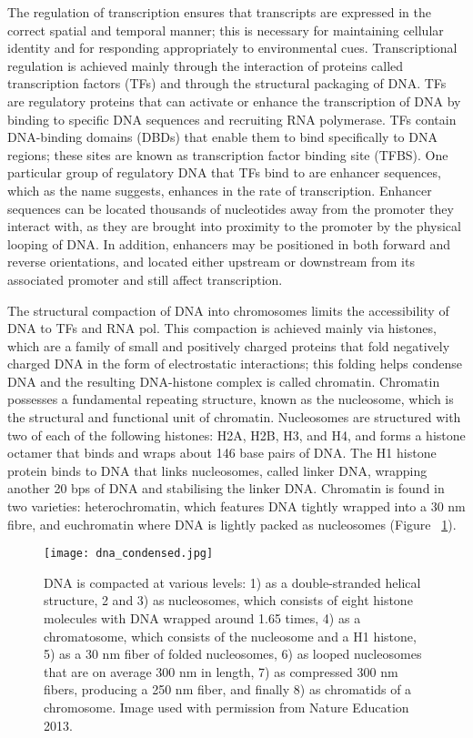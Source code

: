 The regulation of transcription ensures that transcripts are expressed in the correct spatial and temporal manner; this is necessary for maintaining cellular identity and for responding appropriately to environmental cues. Transcriptional regulation is achieved mainly through the interaction of proteins called transcription factors (TFs) and through the structural packaging of DNA. TFs are regulatory proteins that can activate or enhance the transcription of DNA by binding to specific DNA sequences and recruiting RNA polymerase\cite{pmid11092823}. TFs contain DNA-binding domains (DBDs) that enable them to bind specifically to DNA regions; these sites are known as transcription factor binding site (TFBS). One particular group of regulatory DNA that TFs bind to are enhancer sequences, which as the name suggests, enhances in the rate of transcription. Enhancer sequences can be located thousands of nucleotides away from the promoter they interact with, as they are brought into proximity to the promoter by the physical looping of DNA. In addition, enhancers may be positioned in both forward and reverse orientations, and located either upstream or downstream from its associated promoter and still affect transcription.

The structural compaction of DNA into chromosomes limits the accessibility of DNA to TFs and RNA pol. This compaction is achieved mainly via histones, which are a family of small and positively charged proteins that fold negatively charged DNA in the form of electrostatic interactions; this folding helps condense DNA and the resulting DNA-histone complex is called chromatin. Chromatin possesses a fundamental repeating structure\cite{holde01111974}, known as the nucleosome, which is the structural and functional unit of chromatin. Nucleosomes are structured with two of each of the following histones: H2A, H2B, H3, and H4, and forms a histone octamer that binds and wraps about 146 base pairs of DNA. The H1 histone protein binds to DNA that links nucleosomes, called linker DNA, wrapping another 20 bps of DNA and stabilising the linker DNA. Chromatin is found in two varieties: heterochromatin, which features DNA tightly wrapped into a 30 nm fibre, and euchromatin where DNA is lightly packed as nucleosomes (Figure ~\ref{fig:dna_condensed}).

\begin{figure}[!ht]
   \centering
   \texttt{[image: dna\_condensed.jpg]}
   \caption[DNA packaging]{DNA is compacted at various levels: 1) as a double-stranded helical structure, 2 and 3) as nucleosomes, which consists of eight histone molecules with DNA wrapped around 1.65 times, 4) as a chromatosome, which consists of the nucleosome and a H1 histone, 5) as a 30 nm fiber of folded nucleosomes, 6) as looped nucleosomes that are on average 300 nm in length, 7) as compressed 300 nm fibers, producing a 250 nm fiber, and finally 8) as chromatids of a chromosome. Image used with permission from Nature Education 2013.}
   \label{fig:dna_condensed}
\end{figure}

